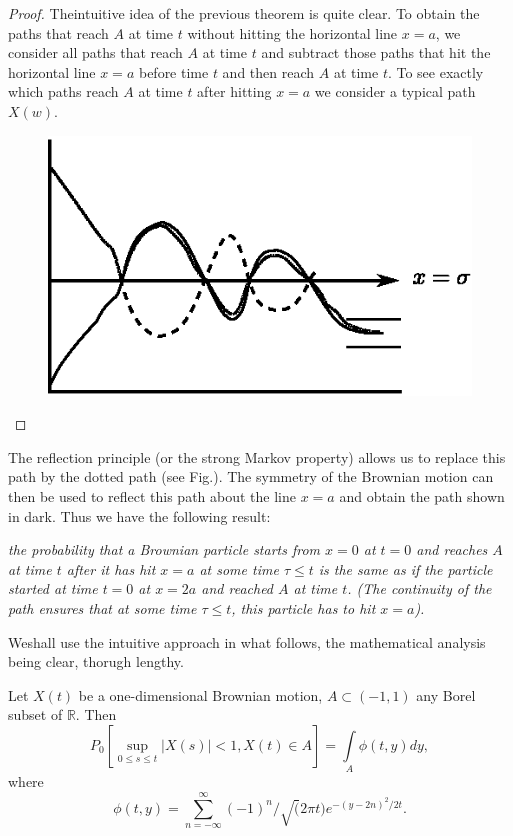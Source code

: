 \begin{proof}
The\pageoriginale intuitive idea of the previous theorem is quite
clear. To obtain the paths that reach $A$ at time $t$ without hitting
the horizontal line $x=a$, we consider all paths that reach $A$ at
time $t$ and subtract those paths that hit the horizontal line $x=a$
before time $t$ and then reach $A$ at time $t$. To see exactly which
paths reach $A$ at time $t$ after hitting $x=a$ we consider a typical
path $X(w)$.
\begin{figure}[H]
\centering
\includegraphics{figure/fig6.eps}
\end{figure}
\end{proof}

The reflection principle (or the strong Markov property) allows us to
replace this path by the dotted path (see Fig.). The symmetry of the
Brownian motion can then be used to reflect this path about the line
$x=a$ and obtain the path shown in dark. Thus we have the following
result:

{\em the probability that a Brownian particle starts from $x=0$ at
  $t=0$ and reaches $A$ at time $t$ after it has hit $x=a$ at some
  time $\tau\leq t$ is the same as if the particle started at time
  $t=0$ at $x=2a$ and reached $A$ at time $t$. (The continuity of the
  path ensures that at some time $\tau\leq t$, this particle has to
  hit $x=a$).}

We\pageoriginale shall use the intuitive approach in what follows, the
mathematical analysis being clear, thorugh lengthy.

\begin{theorem*}
Let $X(t)$ be a one-dimensional Brownian motion, $A\subset (-1,1)$ any
Borel subset of $\mathbb{R}$. Then
$$
P_{0}\left[\sup\limits_{0\leq s\leq t}|X(s)|<1, X(t)\in
  A\right]=\int\limits_{A}\phi(t,y)dy, 
$$
where
$$
\phi(t,y)=\sum\limits^{\infty}_{n=-\infty}(-1)^{n}/\surd(2\pi
t)e^{-(y-2n)^{2}/2t}.
$$
\end{theorem*}

